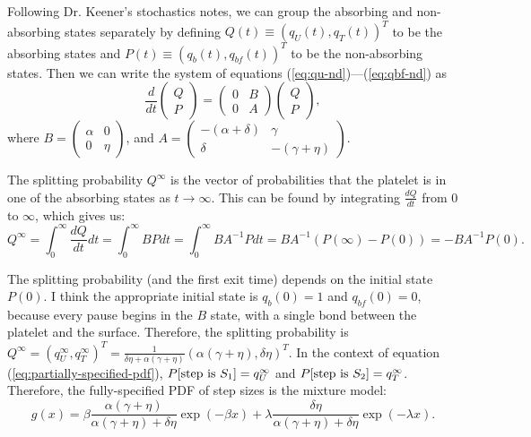 \documentclass{article}
\newcommand{\tn}{\textnormal}
\newcommand{\dd}{d}
\newcommand{\Der}[2]{\frac{\dd #1}{\dd #2}}
\newcommand{\Integral}[4]{\int_{#3}^{#4} {#1} \dd #2}
\begin{document}
Following Dr. Keener's stochastics notes, we can group the absorbing
and non-absorbing states separately by defining
$Q(t) \equiv (q_U(t), q_T(t))^T$ to be the absorbing states and
$P(t) \equiv (q_b(t), q_{bf}(t))^T$ to be the non-absorbing
states. Then we can write the system of equations
(\ref{eq:qu-nd})---(\ref{eq:qbf-nd}) as
\begin{equation}
  \label{eq:abs-nabs-sys}
  \Der{}{t}
  \begin{pmatrix}
    Q \\ P
  \end{pmatrix}
  =
  \begin{pmatrix}
    0 & B \\
    0 & A
  \end{pmatrix}
  \begin{pmatrix}
    Q \\ P
  \end{pmatrix},
\end{equation}
where $B = \begin{pmatrix} \alpha & 0 \\ 0 & \eta \end{pmatrix}$, and
$A = \begin{pmatrix} -(\alpha + \delta) & \gamma \\ \delta & -(\gamma
  + \eta) \end{pmatrix}$.

The splitting probability $Q^\infty$ is the vector of probabilities
that the platelet is in one of the absorbing states as $t \rightarrow
\infty$. This can be found by integrating $\Der{Q}{t}$ from $0$ to
$\infty$, which gives us:
\begin{equation*}
  Q^\infty = \Integral{\Der{Q}{t}}{t}{0}{\infty} = \Integral{B
    P}{t}{0}{\infty} = \Integral{B A^{-1} P}{t}{0}{\infty} = B A^{-1}
  \left(P(\infty) - P(0) \right) = - B A^{-1} P(0).
\end{equation*}

The splitting probability (and the first exit time) depends on the
initial state $P(0)$. I think the appropriate initial state is
$q_b(0) = 1$ and $q_{bf}(0) = 0$, because every pause begins in the
$B$ state, with a single bond between the platelet and the
surface. Therefore, the splitting probability is
$Q^\infty = (q_U^\infty, q_T^\infty)^T = \frac{1}{\delta \eta +
  \alpha(\gamma + \eta)} \left( \alpha (\gamma + \eta), \delta \eta
\right)^T$. In the context of equation
(\ref{eq:partially-specified-pdf}),
$P[\tn{step is } S_1] = q_U^\infty$ and
$P[\tn{step is } S_2] = q_T^\infty$. Therefore, the fully-specified
PDF of step sizes is the mixture model:
\begin{equation}
  \label{eq:fully-specified-pdf}
  g(x) = \beta \frac{\alpha (\gamma + \eta)}{\alpha (\gamma + \eta) +
    \delta\eta} \exp(-\beta x) + \lambda \frac{\delta \eta}{\alpha
    (\gamma + \eta) + \delta \eta} \exp(-\lambda x).
\end{equation}
\end{document}
